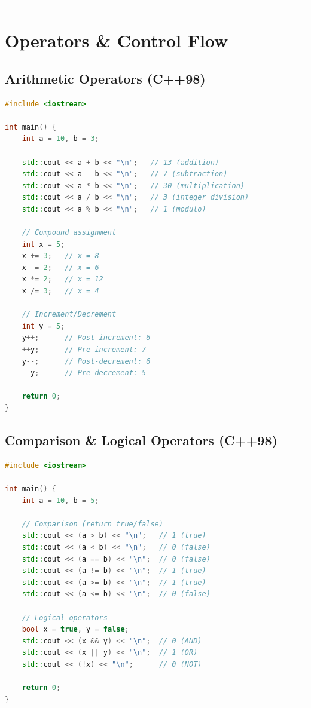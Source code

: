 \begin{center}\rule{0.5\linewidth}{0.5pt}\end{center}

\hypertarget{operators-control-flow}{%
\section{Operators \& Control Flow}\label{operators-control-flow}}

\hypertarget{arithmetic-operators-c98}{%
\subsection{Arithmetic Operators
(C++98)}\label{arithmetic-operators-c98}}

\begin{lstlisting}[language={C++}]
#include <iostream>

int main() {
    int a = 10, b = 3;
    
    std::cout << a + b << "\n";   // 13 (addition)
    std::cout << a - b << "\n";   // 7 (subtraction)
    std::cout << a * b << "\n";   // 30 (multiplication)
    std::cout << a / b << "\n";   // 3 (integer division)
    std::cout << a % b << "\n";   // 1 (modulo)
    
    // Compound assignment
    int x = 5;
    x += 3;   // x = 8
    x -= 2;   // x = 6
    x *= 2;   // x = 12
    x /= 3;   // x = 4
    
    // Increment/Decrement
    int y = 5;
    y++;      // Post-increment: 6
    ++y;      // Pre-increment: 7
    y--;      // Post-decrement: 6
    --y;      // Pre-decrement: 5
    
    return 0;
}
\end{lstlisting}

\hypertarget{comparison-logical-operators-c98}{%
\subsection{Comparison \& Logical Operators
(C++98)}\label{comparison-logical-operators-c98}}

\begin{lstlisting}[language={C++}]
#include <iostream>

int main() {
    int a = 10, b = 5;
    
    // Comparison (return true/false)
    std::cout << (a > b) << "\n";   // 1 (true)
    std::cout << (a < b) << "\n";   // 0 (false)
    std::cout << (a == b) << "\n";  // 0 (false)
    std::cout << (a != b) << "\n";  // 1 (true)
    std::cout << (a >= b) << "\n";  // 1 (true)
    std::cout << (a <= b) << "\n";  // 0 (false)
    
    // Logical operators
    bool x = true, y = false;
    std::cout << (x && y) << "\n";  // 0 (AND)
    std::cout << (x || y) << "\n";  // 1 (OR)
    std::cout << (!x) << "\n";      // 0 (NOT)
    
    return 0;
}
\end{lstlisting}

